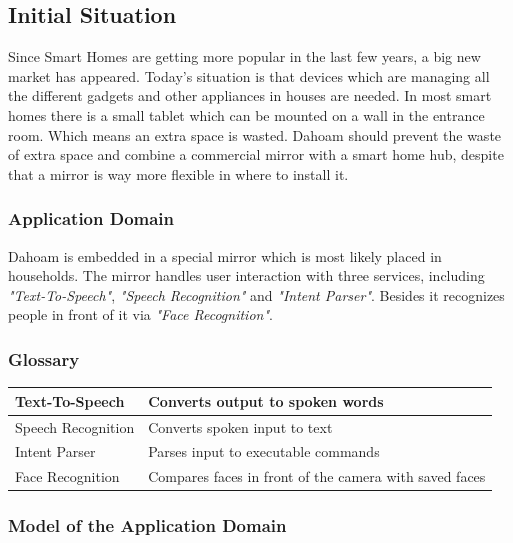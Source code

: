 \documentclass[12pt]{article}
\theoremstyle{definition}
\newenvironment{explanation}{%
   \setlength{\parindent}{0pt}
   \itshape
   \color{blue}
   \normalfont
}{}
\begin{document}
\subsection{Initial Situation}
Since Smart Homes are getting more popular in the last few years, a big new market has appeared. Today’s situation is that devices which are managing all the different gadgets and other appliances in houses are needed. In most smart homes there is a small tablet which can be mounted on a wall in the entrance room. Which means an extra space is wasted. Dahoam should prevent the waste of extra space and combine a commercial mirror with a smart home hub, despite that a mirror is way more flexible in where to install it.

\subsubsection{Application Domain}
Dahoam is embedded in a special mirror which is most likely placed in households. The mirror handles user interaction with three services, including \textit{"Text-To-Speech"}, \textit{"Speech Recognition"} and \textit{"Intent Parser"}. Besides it recognizes people in front of it via \textit{"Face Recognition"}.

\subsubsection{Glossary}

\begin{flushleft}
\begin{tabular}{|l|l|}
\hline
Text-To-Speech & Converts output to spoken words\\ \hline
Speech Recognition & Converts spoken input to text\\ \hline
Intent Parser & Parses input to executable commands\\ \hline
Face Recognition & Compares faces in front of the camera with saved faces\\ \hline
\end{tabular}
\end{flushleft}

\subsubsection{Model of the Application Domain}
\begin{explanation}

\end{explanation}
\end{document}
